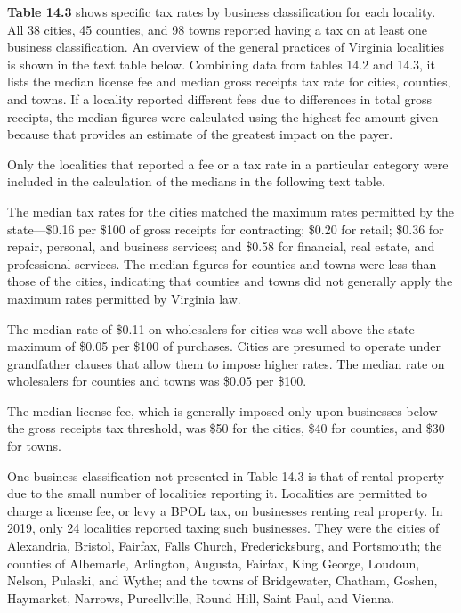 \documentclass[
]{book}
\newenvironment{Shaded}{\begin{snugshade}}{\end{snugshade}}
\newcommand{\CommentTok}[1]{\textcolor[rgb]{0.56,0.35,0.01}{\textit{#1}}}
\begin{document}
\textbf{Table 14.3} shows specific tax rates by business classification for each locality. All 38 cities, 45 counties, and 98 towns reported having a tax on at least one business classification. An overview of the general practices of Virginia localities is shown in the text table below. Combining data from tables 14.2 and 14.3, it lists the median license fee and median gross receipts tax rate for cities, counties, and towns. If a locality reported different fees due to differences in total gross receipts, the median figures were calculated using the highest fee amount given because that provides an estimate of the greatest impact on the payer.

Only the localities that reported a fee or a tax rate in a particular category were included in the calculation of the medians in the following text table.

\begin{Shaded}
\end{Shaded}

The median tax rates for the cities matched the maximum rates permitted by the state---\$0.16 per \$100 of gross receipts for contracting; \$0.20 for retail; \$0.36 for repair, personal, and business services; and \$0.58 for financial, real estate, and professional services. The median figures for counties and towns were less than those of the cities, indicating that counties and towns did not generally apply the maximum rates permitted by Virginia law.

The median rate of \$0.11 on wholesalers for cities was well above the state maximum of \$0.05 per \$100 of purchases. Cities are presumed to operate under grandfather clauses that allow them to impose higher rates. The median rate on wholesalers for counties and towns was \$0.05 per \$100.

The median license fee, which is generally imposed only upon businesses below the gross receipts tax threshold, was \$50 for the cities, \$40 for counties, and \$30 for towns.

One business classification not presented in Table 14.3 is that of rental property due to the small number of localities reporting it. Localities are permitted to charge a license fee, or levy a BPOL tax, on businesses renting real property. In 2019, only 24 localities reported taxing such businesses. They were the cities of Alexandria, Bristol, Fairfax, Falls Church, Fredericksburg, and Portsmouth; the counties of Albemarle, Arlington, Augusta, Fairfax, King George, Loudoun, Nelson, Pulaski, and Wythe; and the towns of Bridgewater, Chatham, Goshen, Haymarket, Narrows, Purcellville, Round Hill, Saint Paul, and Vienna.
\end{document}
